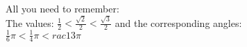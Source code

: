 \documentclass[preview]{standalone}
\begin{document}
\begin{center}
All you need to remember: \\ The values: $\frac{1}{2} < \frac{\sqrt{2}}{2} < \frac{\sqrt{3}}{2}$ and the corresponding angles: \\ $\frac{1}{6} \pi < \frac{1}{4} \pi < rac{1}{3} \pi$
\end{center}
\end{document}
